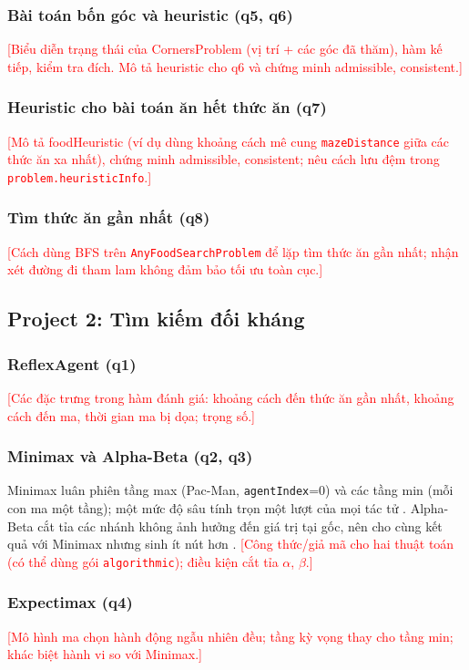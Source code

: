 \documentclass[conference]{IEEEtran}
\newcommand{\todo}[1]{\textcolor{red}{[#1]}}
\begin{document}
\subsubsection{Bài toán bốn góc và heuristic (q5, q6)}
\todo{Biểu diễn trạng thái của CornersProblem (vị trí + các góc đã thăm), hàm kế tiếp, kiểm tra đích. Mô tả heuristic cho q6 và chứng minh admissible, consistent.}

\subsubsection{Heuristic cho bài toán ăn hết thức ăn (q7)}
\todo{Mô tả foodHeuristic (ví dụ dùng khoảng cách mê cung \texttt{mazeDistance} giữa các thức ăn xa nhất), chứng minh admissible, consistent; nêu cách lưu đệm trong \texttt{problem.heuristicInfo}.}

\subsubsection{Tìm thức ăn gần nhất (q8)}
\todo{Cách dùng BFS trên \texttt{AnyFoodSearchProblem} để lặp tìm thức ăn gần nhất; nhận xét đường đi tham lam không đảm bảo tối ưu toàn cục.}

\subsection{Project 2: Tìm kiếm đối kháng}

\subsubsection{ReflexAgent (q1)}
\todo{Các đặc trưng trong hàm đánh giá: khoảng cách đến thức ăn gần nhất, khoảng cách đến ma, thời gian ma bị dọa; trọng số.}

\subsubsection{Minimax và Alpha-Beta (q2, q3)}
Minimax luân phiên tầng max (Pac-Man, \texttt{agentIndex}=0) và các tầng min (mỗi con ma một tầng); một mức độ sâu tính trọn một lượt của mọi tác tử \cite{b1,b3}. Alpha-Beta cắt tỉa các nhánh không ảnh hưởng đến giá trị tại gốc, nên cho cùng kết quả với Minimax nhưng sinh ít nút hơn \cite{b4}.
\todo{Công thức/giả mã cho hai thuật toán (có thể dùng gói \texttt{algorithmic}); điều kiện cắt tỉa $\alpha$, $\beta$.}

\subsubsection{Expectimax (q4)}
\todo{Mô hình ma chọn hành động ngẫu nhiên đều; tầng kỳ vọng thay cho tầng min; khác biệt hành vi so với Minimax.}
\end{document}
